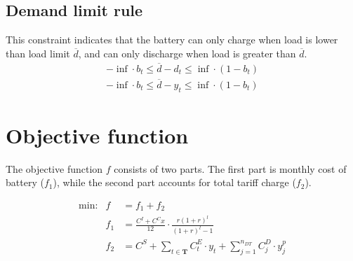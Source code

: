 \documentclass[11pt]{article}
\begin{document}
\subsection{Demand limit rule}
This constraint indicates that the battery can only charge when load is lower than load limit $\overline{d}$, and can only discharge when load is greater than $\overline{d}$.
\begin{eqnarray}
-\inf \cdot b_t
\le
\overline{d} - d_t
\le
\inf \cdot (1-b_t) \\
-\inf \cdot b_t
\le
\overline{d} - y_t
\le
\inf \cdot (1-b_t)
\end{eqnarray}

\section{Objective function}
The objective function $f$ consists of two parts. The first part is monthly cost of battery ($f_1$), while the second part accounts for total tariff charge ($f_2$).

\begin{eqnarray}
\text{min:} & f & = f_1 + f_2 \\
& f_1 & = \frac{C^I + C^C x}{12} \cdot \frac{r (1+r)^l}{(1+r)^l - 1} \\
& f_2 & = C^S + \sum_{t \in \textbf{T}} C^E_t \cdot y_t + \sum_{j=1}^{n_{DT}} C^D_j \cdot y^p_j
\end{eqnarray}
\end{document}
